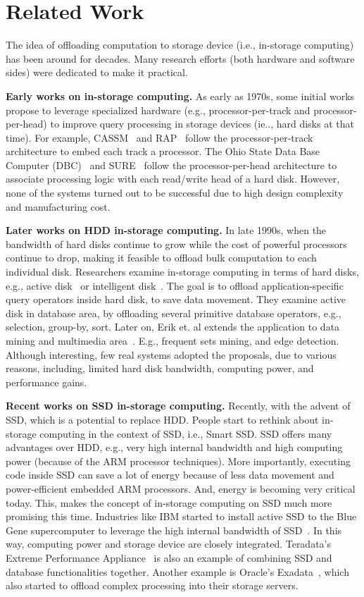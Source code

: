 
\section{Related Work}\label{sec:relatedWork}
The idea of offloading computation to storage device (i.e., in-storage computing) has been around for decades. Many research efforts (both hardware and software sides) were dedicated to make it practical.

\textbf{Early works on in-storage computing.} As early as 1970s, some initial works propose to leverage specialized hardware (e.g., processor-per-track and processor-per-head) to improve query processing in storage devices (ie.., hard disks at that time).
For example, CASSM~\cite{Su1975} and RAP~\cite{Ozkarahan1977} follow the processor-per-track architecture to embed each track a processor.
The Ohio State Data Base Computer (DBC)~\cite{Kannan1978} and SURE~\cite{LeilichSZ78} follow the processor-per-head architecture to associate processing logic with each read/write head of a hard disk.
However, none of the systems turned out to be successful due to high design complexity and manufacturing cost.

\textbf{Later works on HDD in-storage computing.}
In late 1990s, when the bandwidth of hard disks continue to grow while the cost of powerful processors continue to drop, making it feasible to offload bulk computation to each individual disk. Researchers examine in-storage computing in terms of hard disks, e.g., active disk~\cite{Acharya1998ADP} or intelligent disk~\cite{Keeton1998}. The goal is to offload application-specific query operators inside hard disk, to save data movement. They examine active disk in database area, by offloading several primitive database operators, e.g., selection, group-by, sort. Later on, Erik et. al extends the application to data mining and multimedia area~\cite{Riedel1998ASL}. E.g., frequent sets mining, and edge detection. Although interesting, few real systems adopted the proposals, due to various reasons, including, limited hard disk bandwidth, computing power, and performance gains.




\textbf{Recent works on SSD in-storage computing.}
Recently, with the advent of SSD, which is a potential to replace HDD. People start to rethink about in-storage computing in the context of SSD, i.e., Smart SSD.
SSD offers many advantages over HDD, e.g., very high internal bandwidth and high computing power (because of the ARM processor techniques).
More importantly, executing code inside SSD can save a lot of energy because of less data movement and power-efficient embedded ARM processors. And, energy is becoming very critical today.
This, makes the concept of in-storage computing on SSD much more promising this time.
Industries like IBM started to install active SSD to the Blue Gene supercomputer to leverage the high internal bandwidth of SSD~\cite{Julich13}.
In this way, computing power and storage device are closely integrated. Teradata's Extreme Performance Appliance~\cite{Teradata20} is also an example of combining SSD and database functionalities together. Another example is Oracle's Exadata~\cite{Oracle2010}, which also started to offload complex processing into their storage servers.


